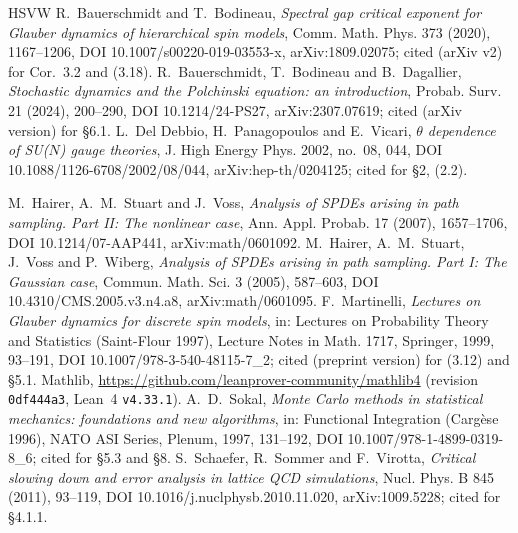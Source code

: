 \documentclass[11pt,a4paper]{article}
\theoremstyle{definition}
\theoremstyle{remark}
\newcommand{\code}[1]{\texttt{#1}}
\begin{document}
\begin{thebibliography}{HSVW}
 R.~Bauerschmidt and T.~Bodineau, \emph{Spectral gap critical exponent for Glauber dynamics of hierarchical spin models}, Comm. Math. Phys. 373 (2020), 1167--1206, DOI 10.1007/s00220-019-03553-x, arXiv:1809.02075; cited (arXiv v2) for Cor.~3.2 and (3.18).
 R.~Bauerschmidt, T.~Bodineau and B.~Dagallier, \emph{Stochastic dynamics and the Polchinski equation: an introduction}, Probab. Surv. 21 (2024), 200--290, DOI 10.1214/24-PS27, arXiv:2307.07619; cited (arXiv version) for \S6.1.
 L.~Del Debbio, H.~Panagopoulos and E.~Vicari, \emph{$\theta$ dependence of SU($N$) gauge theories}, J. High Energy Phys. 2002, no.~08, 044, DOI 10.1088/1126-6708/2002/08/044, arXiv:hep-th/0204125; cited for \S2, (2.2).

 M.~Hairer, A.~M.~Stuart and J.~Voss, \emph{Analysis of SPDEs arising in path sampling. Part II: The nonlinear case}, Ann. Appl. Probab. 17 (2007), 1657--1706, DOI 10.1214/07-AAP441, arXiv:math/0601092.
 M.~Hairer, A.~M.~Stuart, J.~Voss and P.~Wiberg, \emph{Analysis of SPDEs arising in path sampling. Part I: The Gaussian case}, Commun. Math. Sci. 3 (2005), 587--603, DOI 10.4310/CMS.2005.v3.n4.a8, arXiv:math/0601095.
 F.~Martinelli, \emph{Lectures on Glauber dynamics for discrete spin models}, in: Lectures on Probability Theory and Statistics (Saint-Flour 1997), Lecture Notes in Math. 1717, Springer, 1999, 93--191, DOI 10.1007/978-3-540-48115-7\_2; cited (preprint version) for (3.12) and \S5.1.
 Mathlib, \url{https://github.com/leanprover-community/mathlib4} (revision \code{0df444a3}, Lean~4 \code{v4.33.1}).
 A.~D.~Sokal, \emph{Monte Carlo methods in statistical mechanics: foundations and new algorithms}, in: Functional Integration (Carg\`ese 1996), NATO ASI Series, Plenum, 1997, 131--192, DOI 10.1007/978-1-4899-0319-8\_6; cited for \S5.3 and \S8.
 S.~Schaefer, R.~Sommer and F.~Virotta, \emph{Critical slowing down and error analysis in lattice QCD simulations}, Nucl. Phys. B 845 (2011), 93--119, DOI 10.1016/j.nuclphysb.2010.11.020, arXiv:1009.5228; cited for \S4.1.1.
\end{thebibliography}
\end{document}
